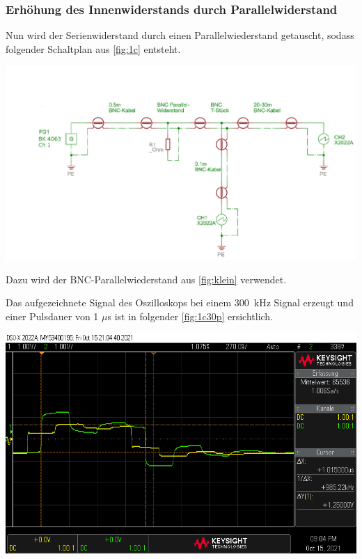 \documentclass[11pt,ngerman]{scrartcl}
\begin{document}
\subsubsection{Erhöhung des Innenwiderstands durch Parallelwiderstand}

\noindent Nun wird der Serienwiderstand durch einen Parallelwiederstand getauscht, sodass folgender Schaltplan aus \autoref{fig:1c} entsteht.

\begin{center}
	\begin{minipage}[t]{0.8\textwidth}
		\includegraphics[width=\textwidth]{1c}
		\label{fig:1c}
	\end{minipage}
\end{center}

\noindent Dazu wird der BNC-Parallelwiederstand aus \autoref{fig:klein} verwendet.

\noindent Das aufgezeichnete Signal des Oszilloskops bei einem \SI{300}{kHz} Signal erzeugt und einer Pulsdauer von 1 $\mu$s ist in folgender \autoref{fig:1c30p} ersichtlich.

\begin{center}
	\begin{minipage}[t]{0.7\textwidth}
		\includegraphics[width=\textwidth]{oszi/scope_0_25}
		\label{fig:1c30p}
	\end{minipage}
\end{center}
\end{document}
